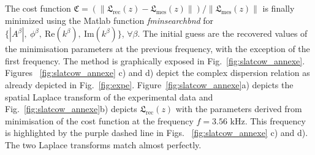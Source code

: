 {The cost function $\mathfrak{C} = \left(\lVert \mathfrak L_{\text{rec}}(z) -\mathfrak L_{\text{mes}}(z) \rVert\right) / \lVert \mathfrak L_{\text{mes}}(z) \rVert$ is finally minimized using the Matlab function \textit{fminsearchbnd} for $\{|A^{\beta}|,~\phi^\beta,~\textrm{Re}\left( k^{\beta}\right),~\textrm{Im}\left( k^{\beta}\right) \}$, $\forall \beta$. The initial guess are the recovered values of the minimisation parameters at the previous frequency, with the exception of the first frequency. The method is graphically exposed in Fig.~\ref{fig:slatcow_annexe}. Figures ~\ref{fig:slatcow_annexe} c) and d) depict the complex dispersion relation as already depicted in Fig.~\ref{fig:expe}. Figure~\ref{fig:slatcow_annexe}a) depicts the spatial Laplace transform of the experimental data and Fig.~\ref{fig:slatcow_annexe}b) depicts $\mathfrak L_{\text{rec}}(z)$ with the parameters derived from minimisation of the cost function at the frequency $f = 3.56$ kHz. This frequency is highlighted by the purple dashed line in Figs. ~\ref{fig:slatcow_annexe} c) and d). The two Laplace transforms match almost perfectly.}
\endgroup